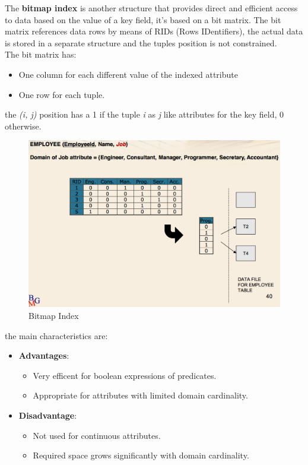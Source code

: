 \documentclass[12pt]{article}
\begin{document}
The \textbf{bitmap index} is another structure that provides direct and efficient access to data based on the value of a key field, it's based on a bit matrix. The bit matrix references data rows by means of RIDs (Rows IDentifiers), the actual data is stored in a separate structure and the tuples position is not constrained.\\
The bit matrix has:
\begin{itemize}
  \item One column for each different value of the indexed attribute
  \item One row for each tuple.
\end{itemize}
the \textit{(i, j)} position has a 1 if the tuple \textit{i} as \textit{j} like attributes for the key field, 0 otherwise.
\begin{figure}[h!]
  \includegraphics[width=\linewidth]{images/bitmapindex.png}
  \caption{Bitmap Index}
  \label{fig:bitmapindex}
\end{figure}
the main characteristics are:
\begin{itemize}
  \item \textbf{Advantages}:
  \begin{itemize}
    \item Very efficent for boolean expressions of predicates.
    \item Appropriate for attributes with limited domain cardinality.
  \end{itemize}
  \item \textbf{Disadvantage}:
  \begin{itemize}
    \item Not used for continuous attributes.
    \item Required space grows significantly with domain cardinality.
  \end{itemize}
\end{itemize}
\end{document}
